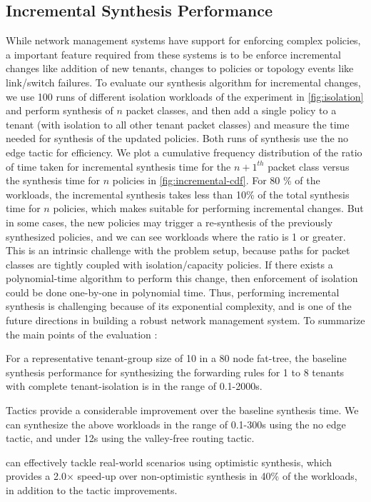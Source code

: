 \subsection{Incremental Synthesis Performance} \label{sec:incrementaleval}
While network management systems have support for enforcing complex policies, 
a important feature required from these systems is to be enforce incremental changes
like addition of new tenants, changes to policies or topology events like link/switch 
failures. To evaluate our synthesis algorithm for incremental changes, we use 100 runs of 
different isolation workloads of the experiment in  \cref{fig:isolation} and perform synthesis
of $n$ packet classes, and then
add a single policy to a tenant (with isolation to all other tenant packet classes) and
measure the time needed for synthesis of the updated policies. Both runs of synthesis use the
no edge tactic for efficiency. We plot a cumulative frequency 
distribution of the ratio of time taken for incremental synthesis time for the $n+1^{th}$ packet class
 versus the synthesis time for $n$ policies  in \cref{fig:incremental-cdf}. For 80 \% of the workloads, the incremental 
synthesis takes less than 10\% of the total synthesis time for $n$ policies, which makes \Name suitable for 
performing incremental changes. But in some cases, the new policies may trigger a re-synthesis 
of the previously synthesized policies, and we can see workloads where the ratio is 1 or greater. This 
is an intrinsic challenge with the problem setup, because paths for packet classes are tightly
coupled with isolation/capacity policies. If there exists a polynomial-time algorithm to perform
this change, then enforcement of isolation could be done one-by-one in polynomial time.
Thus, performing incremental synthesis is challenging because of its exponential complexity,
and is one of the future directions
in building a robust network management system. \newline
To summarize the main points of the evaluation : 
\begin{compactitemize}
	\item For a representative tenant-group size of 10 in a 80 node fat-tree, the baseline 
	synthesis performance for synthesizing the forwarding rules for 1 to 8 tenants with 
	complete tenant-isolation is in the range of 0.1-2000s. 
	\item Tactics provide a considerable improvement over the baseline synthesis time.
	We can synthesize the above workloads in the 
	 range of 0.1-300s  using the no edge tactic, and under 12s using the valley-free routing tactic.
	 \item \Name can effectively tackle real-world scenarios using optimistic synthesis,
	 which provides a 2.0$\times$ speed-up over non-optimistic synthesis in 40\% of the 
	 workloads, in addition to the tactic improvements.
\end{compactitemize}


